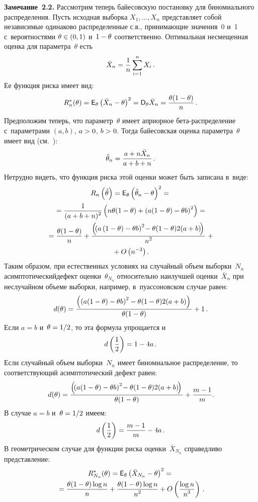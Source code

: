 \begin{multicols}{2}
\noindent
\textbf{Замечание~2.2.}
Рассмотрим теперь байесовскую постановку для биномиального распределения. 
Пусть исходная выборка $X_1,\ldots,X_n$ представляет собой независимые одинаково 
распределенные с.в., принимающие значения~0 и~1 
с~вероятностями $\theta\hm \in (0,1)$ и~$1\hm - \theta$ соответственно.
Оптимальная несмещенная оценка для параметра~$\theta$ есть
$$
\bar X_n = \displaystyle\frac{\displaystyle 1\mathstrut}{\displaystyle n\mathstrut} \sum\limits_{i=1}^n X_i\,.
$$
Ее функция риска имеет вид:
$$
R^*_{n}(\theta) = {\sf E}_\theta \left(\bar X_n - \theta\right)^2 =
 {\sf D}_\theta \bar X_n =\displaystyle\frac{\displaystyle \theta(1 - \theta)\mathstrut}{\displaystyle n\mathstrut}\,.
$$
Предположим теперь, что параметр~$\theta$ имеет априорное бе\-та-рас\-пре\-де\-ле\-ние 
с~параметрами $(a,b)$, $a\hm > 0$, $b\hm > 0$. Тогда байесовская оценка 
параметра~$\theta$ имеет вид (см.~\cite[с.~221]{4-ben}):
$$
\hat\theta_n = \displaystyle\frac{\displaystyle a + n\bar X_n\mathstrut}{\displaystyle a + b + n\mathstrut}\,.
$$
Нетрудно видеть, что функция риска этой оценки может быть записана в~виде:
\begin{multline*}
R_{n}\left(\hat\theta\right) = {\sf E}_\theta \left(\hat\theta_n - \theta\right)^2 ={}\\
{}=
\displaystyle\frac{\displaystyle 1\mathstrut}{\displaystyle (a + b + n)^2\mathstrut} \left(n\theta(1 - \theta) + \left(a(1 -
\theta) - \theta b\right)^2\right) ={}
\\
{}= \displaystyle\frac{\displaystyle \theta(1 - \theta)\mathstrut}{\displaystyle n\mathstrut} + \displaystyle\frac{\displaystyle \left(\! \left(a\left(1 - \theta\right) - 
\theta b\right)^2\! -\theta(1 - \theta)2(a + b)\!\right)\mathstrut}{\displaystyle n^2\mathstrut} + {}\\
{}+ O\left(n^{-3}\right).
\end{multline*}
Таким образом, при естественных условиях на случайный объем выборки~$N_n$ 
асимптотический\linebreak дефект оценки~$\theta_{N_n}$ относительно наилучшей оценки~$\bar X_n$ 
при неслучайном объеме выборки, например, в~пуассоновском случае равен:
$$
d(\theta) = \displaystyle\frac{\displaystyle \left( \left(a(1 - \theta) - \theta b\right)^2 -
\theta(1 - \theta)2(a + b)\right)\mathstrut}{\displaystyle \theta(1 - \theta)\mathstrut} + 1\,.
$$
Если $a = b$ и~$\theta\hm = 1/2$, то эта формула упрощается и~$$
d\left(\displaystyle\frac{\displaystyle 1\mathstrut}{\displaystyle 2\mathstrut}\right) = 1 - 4a\,.
$$
Если случайный объем выборки~$N_n$ имеет биномиальное распределение, то соответствующий 
асимп\-то\-ти\-че\-ский дефект равен:
$$
d(\theta) = \displaystyle\frac{\displaystyle \left( \!\left(a(1 - \theta) - \theta b\right)^2\! -
\theta(1 - \theta)2(a + b)\!\right)\mathstrut}{\displaystyle \theta(1 - \theta)\mathstrut} + \displaystyle\frac{\displaystyle m - 1\mathstrut}{\displaystyle m\mathstrut}.\hspace*{-0.83063pt}
$$
В случае $a = b$ и~$\theta\hm = 1/2$ имеем:
$$
d\left(\displaystyle\frac{\displaystyle 1\mathstrut}{\displaystyle 2\mathstrut}\right) = \displaystyle\frac{\displaystyle m - 1\mathstrut}{\displaystyle m\mathstrut} - 4a\,.
$$
В геометрическом случае для функции риска оценки~$\bar X_{N_n}$ справедливо 
представление:
\begin{multline*}
R^*_{N_n}(\theta) = {\sf E}_\theta \left(\bar X_{N_n} - \theta\right)^2 ={}\\
{}=
\displaystyle\frac{\displaystyle \theta(1 - \theta)\log n\mathstrut}{\displaystyle n\mathstrut} + \displaystyle\frac{\displaystyle \theta(1 - \theta)\log n\mathstrut}{\displaystyle n^2\mathstrut} + 
 O\left(\displaystyle\frac{\displaystyle \log n\mathstrut}{\displaystyle n^3\mathstrut}\right)\,.
\end{multline*}



\end{multicols}
